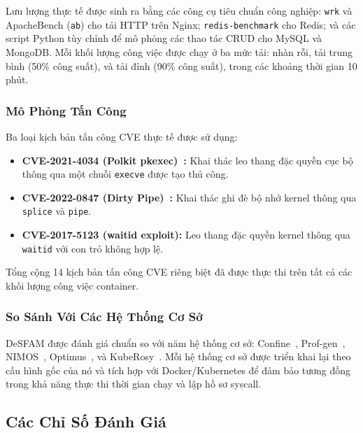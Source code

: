 Lưu lượng thực tế được sinh ra bằng các công cụ tiêu chuẩn công nghiệp: \texttt{wrk} và ApacheBench
(\texttt{ab}) cho tải HTTP trên Nginx; \texttt{redis-benchmark} cho Redis; và các script Python
tùy chỉnh để mô phỏng các thao tác CRUD cho MySQL và MongoDB. Mỗi khối lượng công việc được chạy
ở ba mức tải: nhàn rỗi, tải trung bình (50\% công suất), và tải đỉnh (90\% công suất), trong
các khoảng thời gian 10 phút.

\subsubsection{Mô Phỏng Tấn Công}
\label{subsubsec:attack_simulation}

Ba loại kịch bản tấn công CVE thực tế được sử dụng:
\begin{itemize}
  \item \textbf{CVE-2021-4034 (Polkit pkexec)~\cite{cve_2021_4034}:} Khai thác leo thang đặc
        quyền cục bộ thông qua một chuỗi \texttt{execve} được tạo thủ công.
  \item \textbf{CVE-2022-0847 (Dirty Pipe)~\cite{cve_2022_0847}:} Khai thác ghi đè bộ nhớ kernel
        thông qua \texttt{splice} và \texttt{pipe}.
  \item \textbf{CVE-2017-5123 (waitid exploit):} Leo thang đặc quyền kernel thông qua \texttt{waitid}
        với con trỏ không hợp lệ.
\end{itemize}

Tổng cộng 14 kịch bản tấn công CVE riêng biệt đã được thực thi trên tất cả các khối lượng công
việc container.

\subsubsection{So Sánh Với Các Hệ Thống Cơ Sở}
\label{subsubsec:baselines}

DeSFAM được đánh giá chuẩn so với năm hệ thống cơ sở: Confine~\cite{ref31_confine},
Prof-gen~\cite{ref36_profgen}, NIMOS~\cite{ref38_nimos}, Optimus~\cite{ref27_optimus}, và
KubeRosy~\cite{ref29_kuberosy}. Mỗi hệ thống cơ sở được triển khai lại theo cấu hình gốc của
nó và tích hợp với Docker/Kubernetes để đảm bảo tương đồng trong khả năng thực thi thời gian
chạy và lập hồ sơ syscall.

\subsection{Các Chỉ Số Đánh Giá}
\label{subsec:metrics}

